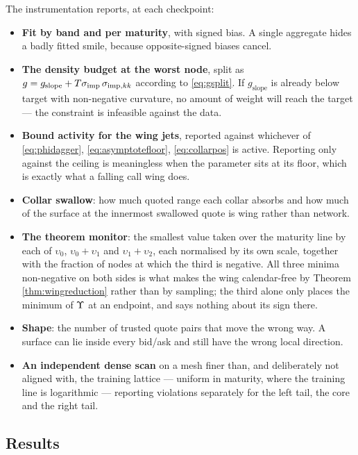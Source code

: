 The instrumentation reports, at each checkpoint:

\begin{itemize}
  \item \textbf{Fit by band and per maturity}, with signed bias. A single aggregate hides a badly
    fitted smile, because opposite-signed biases cancel.
  \item \textbf{The density budget at the worst node}, split as $g=g_{\mathrm{slope}}+T\sigma_{\mathrm{imp}}\,\sigma_{\mathrm{imp},kk}$
    according to \eqref{eq:gsplit}. If $g_{\mathrm{slope}}$ is already below target with non-negative
    curvature, no amount of weight will reach the target --- the constraint is infeasible against the
    data.
  \item \textbf{Bound activity for the wing jets}, reported against whichever of
    \eqref{eq:phidagger}, \eqref{eq:asymptotefloor}, \eqref{eq:collarpos} is active. Reporting only
    against the ceiling is meaningless when the parameter sits at its floor, which is exactly what a
    falling call wing does.
  \item \textbf{Collar swallow}: how much quoted range each collar absorbs and how much of the
    surface at the innermost swallowed quote is wing rather than network.
  \item \textbf{The theorem monitor}: the smallest value taken over the maturity line by each of
    $\upsilon_{0}$, $\upsilon_{0}+\upsilon_{1}$ and $\upsilon_{1}+\upsilon_{2}$, each normalised by
    its own scale, together with the fraction of nodes at which the third is negative. All three
    minima non-negative on both sides is what makes the wing calendar-free by Theorem
    \ref{thm:wingreduction} rather than by sampling; the third alone only places the minimum of
    $\Upsilon$ at an endpoint, and says nothing about its sign there.
  \item \textbf{Shape}: the number of trusted quote pairs that move the wrong way. A surface can lie
    inside every bid/ask and still have the wrong local direction.
  \item \textbf{An independent dense scan} on a mesh finer than, and deliberately not aligned with,
    the training lattice --- uniform in maturity, where the training line is logarithmic ---
    reporting violations separately for the left tail, the core and the right tail.
\end{itemize}


\subsection{Results}

